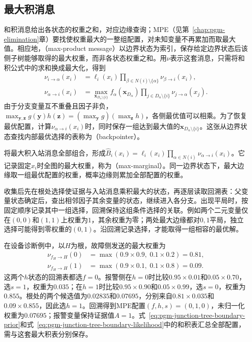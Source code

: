 \subsection{最大积消息}
\label{sec:pgm-junction-tree-max-product}

和积消息给出各状态的权重之和，对应边缘查询；MPE（见第~\ref{chap:pgm-elimination}章）要找使权重最大的一整组配置，对未知变量不再累加而取最大值。相应地，（max-product message）以边界状态为索引，保存给定边界状态后该侧子树能够取得的最大权重，而非各状态权重之和。用$\nu$表示这套消息，只需将和积公式中的求和换成最大化，得到
\begin{equation}
  \begin{aligned}
    \nu_{i\to\alpha}(x_i)
      &=\ell_i(x_i)\prod_{\beta\in N(i)\setminus\{\alpha\}}
         \nu_{\beta\to i}(x_i),\\
    \nu_{\alpha\to i}(x_i)
      &=\max_{\bm{x}_{D_\alpha\setminus\{i\}}}
         f_\alpha(\bm{x}_{D_\alpha})
         \prod_{j\in D_\alpha\setminus\{i\}}
         \nu_{j\to\alpha}(x_j).
  \end{aligned}
  \label{eq:pgm-junction-tree-factor-max}
\end{equation}
由于分支变量互不重叠且因子非负，$\max_{\bm y,\bm z}g(\bm y)h(\bm z)=(\max_{\bm y}g)(\max_{\bm z}h)$，各侧最优值可以相乘。为了恢复最优配置，计算$\nu_{\alpha\to i}(x_i)$时，同时保存一组达到最大值的$\bm{x}_{D_\alpha\setminus\{i\}}$。这张从边界状态查找内部最优选择的表称为（backpointer）。

将最大积入站消息全部组合，形成$\widehat{B}_i(x_i)=\ell_i(x_i)\prod_{\alpha\in N(i)}\nu_{\alpha\to i}(x_i)$。它记录固定$x_i$时全图的最大权重，称为（max-marginal）。同一边界状态下，最大边缘取一组最优配置的权重，概率边缘则累加全部配置的权重。

收集后先在根处选择使证据与入站消息乘积最大的状态，再逐层读取回溯表：父变量状态确定后，查出相邻因子其余变量的状态，继续进入各分支。出现平局时，按固定顺序记录其中一组选择，回溯保持这组条件选择的关联。例如两个二元变量仅在$(0,0)$和$(1,1)$上权重为$1$，其余权重为零；两处最大边缘都对$0,1$平局，独立选择可能得到零权重的$(0,1)$。沿回溯记录选择，才能取得一组相容的最优解。

在设备诊断例中，以$H$为根，故障侧发送的最大权重为
\[
  \begin{aligned}
    \nu_{f_H\to H}(0)&=\max(0.9\times0.9,\;0.1\times0.2)=0.81,\\
    \nu_{f_H\to H}(1)&=\max(0.9\times0.1,\;0.1\times0.8)=0.09.
  \end{aligned}
\]
这两个$h$状态的回溯表都选$f=0$。报警侧在$h=0$时比较$0.95\times0.01$和$0.05\times0.70$，选$s=1$，权重为$0.035$；在$h=1$时比较$0.95\times0.90$和$0.05\times0.99$，选$s=0$，权重为$0.855$。根处的两个候选值为$0.02835$和$0.07695$，分别来自$0.81\times0.035$和$0.09\times0.855$，因此选$h=1$。回溯得到MPE配置$(f,h,s)=(0,1,0)$，未归一化权重为$0.07695$；报警变量保持证据值$A=1$。式~\eqref{eq:pgm-junction-tree-boundary-prior}和式~\eqref{eq:pgm-junction-tree-boundary-likelihood}中的和积表汇总全部配置，需与这套最大积表分别保存。

